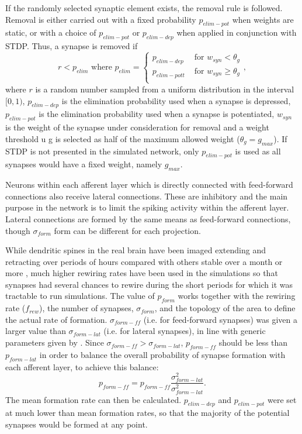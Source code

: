 \documentclass[letterpaper, 10 pt, conference]{ieeeconf}  %
\begin{document}
If the randomly selected synaptic element exists, the removal rule is followed.
Removal is either carried out with a fixed probability $p_{elim-pot}$ when weights are static, or with a choice of $p_{elim-pot}$  or $p_{elim-dep}$ when applied in conjunction with STDP. Thus, a synapse is removed if
%
\begin{equation} \label{eq:elimination_rule}
r<p_{elim} \text{ where } p_{elim} = 
    \begin{cases}
        p_{elim-dep} & \text{ for }   w_{syn}  < \theta_g \\
        p_{elim-pott} & \text{ for }   w_{syn}  \geq \theta_g \\
    \end{cases},
\end{equation}
%
where $r$ is a random number sampled from a uniform distribution in the interval $[0, 1)$, $p_{elim-dep}$ is the elimination probability used when a synapse is depressed, $p_{elim-pot}$ is the elimination probability used when a synapse is potentiated, $w_{syn}$ is the weight of the synapse under consideration for removal and a weight threshold u g is selected as half of the maximum allowed weight ($ \theta_g = g_{max}$). 
If STDP is not presented in the simulated network, only $p_{elim-pot}$ is used as all synapses would have a fixed weight, namely $g_{max}$.

Neurons within each afferent layer which is directly connected with feed-forward connections also receive lateral connections. These are inhibitory and the main purpose in the network is to limit the spiking activity within the afferent layer. 
Lateral connections are formed by the same means as feed-forward connections, though $\sigma_{form}$ form can be different for each projection.

While dendritic spines in the real brain have been imaged extending and retracting over periods of hours compared with others stable over a month or more \cite{Grutzendler2002}, 
much higher rewiring rates have been used in the simulations so that synapses had several chances to rewire during the short periods for which it was tractable to run simulations.
The value of $p_{form}$ works together with the rewiring rate ($f_{rew}$), the number of synapses, $\sigma_{form}$, and the topology of the area to define the actual rate of formation.
$\sigma_{form-ff}$ (i.e. for feed-forward synapses) was given a larger value than $\sigma_{form-lat}$ (i.e. for lateral synapses), in line with generic parameters given by \cite{miikkulainen2006computational}.
Since $\sigma_{form-ff} > \sigma_{form-lat}$, $p_{form-ff}$ should be less than $p_{form-lat}$ in order to balance the overall probability of synapse formation with each afferent layer, to achieve this balance:
\begin{equation}
    p_{form-ff} = p_{form-ff} \frac{\sigma^2_{form-lat}}{\sigma^2_{form-lat}}.
\end{equation}
The mean formation rate can then be calculated. 
$p_{elim-dep}$ and $p_{elim-pot}$ were set at much lower than mean formation rates, so that the majority of the potential synapses would be formed at any point.
\end{document}
